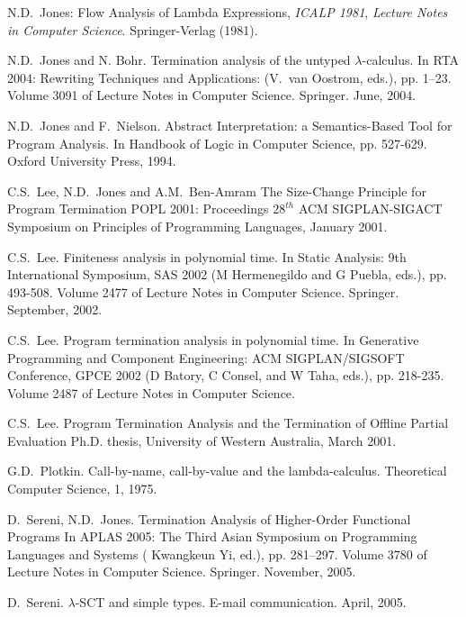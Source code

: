 \documentclass{LMCS}
\theoremstyle{definition}\newtheorem{env}[thm]{Environment}
\begin{document}
\begin{thebibliography}{MMM}
N.D.\ Jones: Flow Analysis of Lambda Expressions, 
{\em ICALP 1981}, {\em Lecture  Notes in Computer Science}. Springer-Verlag (1981).


N.D.\ Jones and N. Bohr.
Termination analysis of the untyped $\lambda$-calculus. 
In RTA 2004: Rewriting Techniques and Applications: 
(V.\ van Oostrom, eds.), pp. 1--23. Volume 3091 of Lecture 
Notes in Computer Science. Springer. June, 2004. 


N.D.\ Jones and F.\ Nielson.
Abstract Interpretation: 
a Semantics-Based Tool for Program Analysis. 
In Handbook of Logic in Computer Science, pp. 527-629. 
Oxford University Press, 1994.  

C.S.\  Lee, N.D.\ Jones and A.M.\ Ben-Amram
\newblock The Size-Change Principle for Program Termination
\newblock POPL 2001: Proceedings $28^{th}$ ACM SIGPLAN-SIGACT Symposium on
          Principles of Programming Languages, January 2001.



C.S.\  Lee.
Finiteness analysis in polynomial time. 
In Static Analysis: 9th International Symposium, SAS 2002 
(M Hermenegildo and G Puebla, eds.), pp. 493-508. Volume 2477 of Lecture 
Notes in Computer Science. Springer. September, 2002. 

C.S.\ Lee.
Program termination analysis in polynomial time.
In Generative Programming and Component Engineering:
ACM SIGPLAN/SIGSOFT Conference, GPCE 2002 
(D Batory, C Consel, and W Taha, eds.), pp. 
218-235. Volume 2487 of Lecture Notes in Computer Science.

C.S.\  Lee.
\newblock Program Termination Analysis and the Termination of Offline 
          Partial Evaluation
\newblock Ph.D. thesis, University of Western Australia, March 2001.

G.D.\ Plotkin. 
Call-by-name, call-by-value and the lambda-calculus. 
Theoretical Computer Science, 1, 1975.

D.\  Sereni, N.D.\ Jones.
Termination Analysis of Higher-Order Functional Programs
In APLAS 2005: The Third Asian Symposium on
Programming Languages and Systems 
( Kwangkeun Yi, ed.), pp. 281--297. Volume 3780 of Lecture 
Notes in Computer Science. Springer. November, 2005. 


D.\  Sereni.
$\lambda$-SCT and simple types.
E-mail communication. April, 2005. 


\end{thebibliography}
\end{document}
